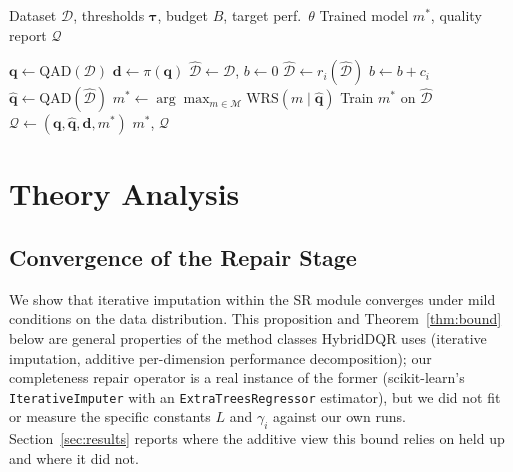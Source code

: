 \documentclass[runningheads]{llncs}
\begin{document}
\begin{algorithm}[t]
\caption{HybridDQR Execution}
\label{alg:hybridDQR}
\begin{algorithmic}[1]
\Require Dataset $\mathcal{D}$, thresholds $\boldsymbol{\tau}$,
         budget $B$, target perf.\ $\theta$
\Ensure Trained model $m^*$, quality report $\mathcal{Q}$

\State $\mathbf{q} \leftarrow \text{QAD}(\mathcal{D})$
\State $\mathbf{d} \leftarrow \pi(\mathbf{q})$
\State $\hat{\mathcal{D}} \leftarrow \mathcal{D}$, $b \leftarrow 0$
    \State $\hat{\mathcal{D}} \leftarrow r_i(\hat{\mathcal{D}})$
    \State $b \leftarrow b + c_i$
  \EndIf
\EndFor
\State $\hat{\mathbf{q}} \leftarrow \text{QAD}(\hat{\mathcal{D}})$
\State $m^* \!\leftarrow\! \arg\max_{m \in \mathcal{M}} \text{WRS}(m \mid \hat{\mathbf{q}})$
\State Train $m^*$ on $\hat{\mathcal{D}}$
\State $\mathcal{Q} \leftarrow (\mathbf{q}, \hat{\mathbf{q}}, \mathbf{d}, m^*)$
\State \Return $m^*$, $\mathcal{Q}$
\end{algorithmic}
\end{algorithm}

\section{Theory Analysis}
\label{sec:analysis}

\subsection{Convergence of the Repair Stage}

We show that iterative imputation within the SR module converges
under mild conditions on the data distribution.
This proposition and Theorem~\ref{thm:bound} below are general
properties of the method classes HybridDQR uses (iterative
imputation, additive per-dimension performance decomposition);
our completeness repair operator is a real instance of the
former (scikit-learn's \texttt{IterativeImputer} with an
\texttt{ExtraTreesRegressor} estimator), but we did not fit or
measure the specific constants $L$ and $\gamma_i$ against our own
runs. Section~\ref{sec:results} reports where the additive view
this bound relies on held up and where it did not.
\end{document}
